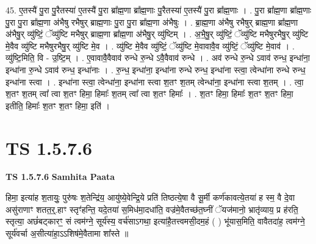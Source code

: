 \documentclass[17pt]{extarticle}
\begin{document}
45. ए॒तस्यै॑ पु॒रा पु॒रैतस्या॑ ए॒तस्यै॑ पु॒रा ब्रा᳚ह्म॒णा ब्रा᳚ह्म॒णाः पु॒रैतस्या॑ ए॒तस्यै॑ पु॒रा ब्रा᳚ह्म॒णाः । . पु॒रा ब्रा᳚ह्म॒णा ब्रा᳚ह्म॒णाः पु॒रा पु॒रा ब्रा᳚ह्म॒णा अ॑भैषु रभैषुर् ब्राह्म॒णाः पु॒रा पु॒रा ब्रा᳚ह्म॒णा अ॑भैषुः । . ब्रा॒ह्म॒णा अ॑भैषु रभैषुर् ब्राह्म॒णा ब्रा᳚ह्म॒णा अ॑भैषु॒र् व्यु॑ष्टिं॒ ॅव्यु॑ष्टि मभैषुर् ब्राह्म॒णा ब्रा᳚ह्म॒णा अ॑भैषु॒र् व्यु॑ष्टिम् । . अ॒भै॒षु॒र् व्यु॑ष्टिं॒ ॅव्यु॑ष्टि मभैषुरभैषु॒र् व्यु॑ष्टि मे॒वैव व्यु॑ष्टि मभैषुरभैषु॒र् व्यु॑ष्टि मे॒व । . व्यु॑ष्टि मे॒वैव व्यु॑ष्टिं॒ ॅव्यु॑ष्टि मे॒वावावै॒व व्यु॑ष्टिं॒ ॅव्यु॑ष्टि मे॒वाव॑ । . व्यु॑ष्टि॒मिति॒ वि - उ॒ष्टि॒म् । . ए॒वावावै॒वैवाव॑ रुन्धे रु॒न्धे ऽवै॒वैवाव॑ रुन्धे । . अव॑ रुन्धे रु॒न्धे ऽवाव॑ रुन्ध॒ इन्धा॑ना॒ इन्धा॑ना रु॒न्धे ऽवाव॑ रुन्ध॒ इन्धा॑नाः । . रु॒न्ध॒ इन्धा॑ना॒ इन्धा॑ना रुन्धे रुन्ध॒ इन्धा॑ना स्त्वा॒ त्वेन्धा॑ना रुन्धे रुन्ध॒ इन्धा॑ना स्त्वा । . इन्धा॑ना स्त्वा॒ त्वेन्धा॑ना॒ इन्धा॑ना स्त्वा श॒तꣳ श॒तम् त्वेन्धा॑ना॒ इन्धा॑ना स्त्वा श॒तम् । . त्वा॒ श॒तꣳ श॒तम् त्वा᳚ त्वा श॒तꣳ हिमा॒ हिमाः᳚ श॒तम् त्वा᳚ त्वा श॒तꣳ हिमाः᳚ । . श॒तꣳ हिमा॒ हिमाः᳚ श॒तꣳ श॒तꣳ हिमा॒ इतीति॒ हिमाः᳚ श॒तꣳ श॒तꣳ हिमा॒ इति॑ । \newline
\pagebreak
{}

\section{ TS 1.5.7.6 }

\textbf{TS 1.5.7.6 } \newline
\textbf{Samhita Paata} \newline

हिमा॒ इत्या॑ह श॒तायुः॒ पुरु॑षः श॒तेन्द्रि॑य॒ आयु॑ष्ये॒वेन्द्रि॒ये प्रति॑ तिष्ठत्ये॒षा वै सू॒र्मी कर्ण॑कावत्ये॒तया॑ ह स्म॒ वै दे॒वा असु॑राणाꣳ शतत॒र्॒.हाꣳ स्तृꣳ॑हन्ति॒ यदे॒तया॑ स॒मिध॑मा॒दधा॑ति॒ वज्र॑मे॒वैतच्छ॑त॒घ्नीं ॅयज॑मानो॒ भ्रातृ॑व्याय॒ प्र ह॑रति॒ स्तृत्या॒ अछं॑बट्कारꣳ॒॒ सं त्वम॑ग्ने॒ सूर्य॑स्य॒ वर्च॑साऽगथा॒ इत्या॑है॒तत्त्वमसी॒दम॒हं ( ) भू॑यास॒मिति॒ वावैतदा॑ह॒ त्वम॑ग्ने॒ सूर्य॑वर्चा अ॒सीत्या॑हा॒ऽऽशिष॑मे॒वैतामा शा᳚स्ते ॥ \newline
\end{document}
